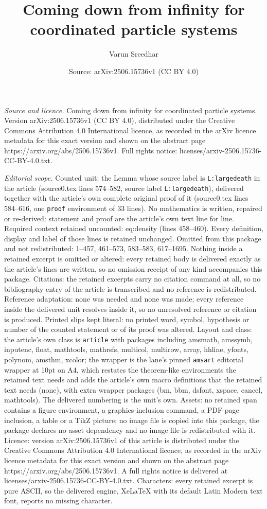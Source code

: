 \documentclass[10pt,a4paper]{amsart}
\title[Coming down from infinity for coordinated particle systems]{Coming down from infinity for coordinated particle systems}
\author{Varun Sreedhar}
\date{Source: arXiv:2506.15736v1 (CC BY 4.0)}
\begin{document}
\maketitle

\noindent\emph{Source and licence.} Coming down from infinity for coordinated particle systems. Version arXiv:2506.15736v1 (CC BY 4.0), distributed under the Creative Commons Attribution 4.0 International licence, as recorded in the arXiv licence metadata for this exact version and shown on the abstract page https://arxiv.org/abs/2506.15736v1. Full rights notice: licenses/arxiv-2506.15736-CC-BY-4.0.txt.\par\smallskip

\noindent\textit{Editorial scope.} Counted unit: the Lemma whose source label is \texttt{L:largedeath} in the article (source0.tex lines 574--582, source label \texttt{L:largedeath}), delivered together with the article's own complete original proof of it (source0.tex lines 584--616, one \texttt{proof} environment of 33 lines). No mathematics is written, repaired or re-derived: statement and proof are the article's own text line for line. Required context retained uncounted: eq:density (lines 458--460). Every definition, display and label of those lines is retained unchanged. Omitted from this package and not redistributed: 1--457, 461--573, 583--583, 617--1695. Nothing inside a retained excerpt is omitted or altered: every retained body is delivered exactly as the article's lines are written, so no omission receipt of any kind accompanies this package. Citations: the retained excerpts carry no citation command at all, so no bibliography entry of the article is transcribed and no reference is redistributed. Reference adaptation: none was needed and none was made; every reference inside the delivered unit resolves inside it, so no unresolved reference or citation is produced. Printed slips kept literal: no printed word, symbol, hypothesis or number of the counted statement or of its proof was altered. Layout and class: the article's own class is \texttt{article} with packages including amsmath, amssymb, inputenc, float, mathtools, mathrsfs, multicol, multirow, array, hhline, yfonts, polynom, amsthm, xcolor; the wrapper is the lane's pinned \texttt{amsart} editorial wrapper at 10pt on A4, which restates the theorem-like environments the retained text needs and adds the article's own macro definitions that the retained text needs (none), with extra wrapper packages (bm, bbm, dsfont, xspace, cancel, mathtools). The delivered numbering is the unit's own. Assets: no retained span contains a figure environment, a graphics-inclusion command, a PDF-page inclusion, a table or a TikZ picture; no image file is copied into this package, the package declares no asset dependency and no image file is redistributed with it. Licence: version arXiv:2506.15736v1 of this article is distributed under the Creative Commons Attribution 4.0 International licence, as recorded in the arXiv licence metadata for this exact version and shown on the abstract page https://arxiv.org/abs/2506.15736v1. A full rights notice is delivered at licenses/arxiv-2506.15736-CC-BY-4.0.txt. Characters: every retained excerpt is pure ASCII, so the delivered engine, XeLaTeX with its default Latin Modern text font, reports no missing character.
\end{document}
